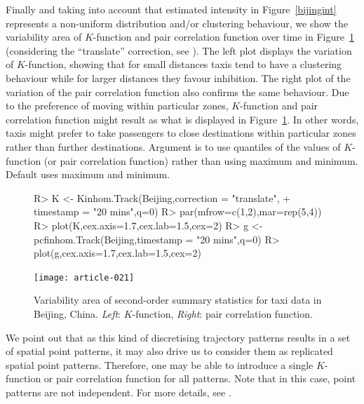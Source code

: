 \documentclass[article]{jss}
\begin{document}
  
  Finally and taking into account that estimated intensity in Figure~\ref{bijingint} represents a non-uniform distribution and/or clustering behaviour, we show the variability area of $K$-function and pair correlation function over time in Figure~\ref{Kgvariation} (considering the ``translate'' correction, see \cite{gabriel2014}). The left plot displays the variation of $K$-function, showing that for small distances taxis tend to have a clustering behaviour while for larger distances they favour inhibition. The right plot of the variation of the pair correlation function also confirms the same behaviour. Due to the preference of moving within particular zones, $K$-function and pair correlation function might result as what is displayed in Figure~\ref{Kgvariation}. In other words, taxis might prefer to take passengers to close destinations within particular zones rather than further destinations. Argument  is to use quantiles of the values of $K$-function (or pair correlation function) rather than using maximum and minimum. Default  uses maximum and minimum.
\begin{figure}[!h]
\begin{center}
\begin{Sinput}
R>   K <- Kinhom.Track(Beijing,correction = "translate",
+                         timestamp = "20 mins",q=0)
R>   par(mfrow=c(1,2),mar=rep(5,4))
R>   plot(K,cex.axis=1.7,cex.lab=1.5,cex=2)
R>   g <- pcfinhom.Track(Beijing,timestamp = "20 mins",q=0)
R>   plot(g,cex.axis=1.7,cex.lab=1.5,cex=2)
\end{Sinput}
\texttt{[image: article-021]}
\end{center}
\caption{Variability area of second-order summary statistics for taxi data in Beijing, China. \emph{Left}: $K$-function, \emph{Right}: pair correlation function.}
\label{Kgvariation}
\end{figure}
  

  We point out that as this kind of discretising trajectory patterns results in a set of spatial point patterns, it may also drive us to consider them as replicated spatial point patterns. Therefore, one may be able to introduce a single $K$-function or pair correlation function for all patterns. Note that in this case, point patterns are not independent. For more details, see \citet[Section 5.4]{D13}.
  
\end{document}
